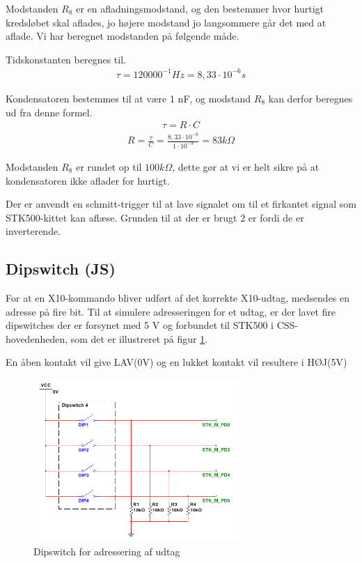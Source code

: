 Modstanden $R_8$ er en afladningsmodstand, og den bestemmer hvor hurtigt kredsløbet skal aflades, jo højere modstand jo langsommere går det med at aflade. Vi har beregnet modstanden på følgende måde.

Tidskonstanten beregnes til.
\begin{align}
\tau = 120000^{-1} Hz = 8,33 \cdot 10^{-6} s
\end{align}


Kondensatoren bestemmes til at være 1 nF, og modstand $R_8$ kan derfor beregnes ud fra denne formel.
\begin{align}
\tau = R \cdot C 
\end{align}
\begin{align}
R = \frac{\tau}{C} = \frac{8,33 \cdot 10^{-6}}{1 \cdot 10^{-9}} = 83 k\Omega
\end{align}

Modstanden $R_8$ er rundet op til $100 k\Omega$, dette gør at vi er helt sikre på at kondensatoren ikke aflader for hurtigt. 

Der er anvendt en schmitt-trigger til at lave signalet om til et firkantet signal som STK500-kittet kan aflæse. Grunden til at der er brugt 2 er fordi de er inverterende. 

\newpage
\subsection{Dipswitch (JS)}
For at en X10-kommando bliver udført af det korrekte X10-udtag, medsendes en adresse på fire bit.
Til at simulere adresseringen for et udtag, er der lavet fire dipswitches der er forsynet med 5 V og forbundet til STK500 i CSS-hovedenheden, som det er illustreret på figur \ref{fig:DIPSWITCH}.

En åben kontakt vil give LAV(0V) og en lukket kontakt vil resultere i HØJ(5V)

\begin{figure}[htbp]
	\centering
	\includegraphics[width=0.70\textwidth]{billeder/HWdesign/DIPSWITCH}
	\caption{Dipswitch for adressering af udtag}
	\label{fig:DIPSWITCH}
\end{figure}

